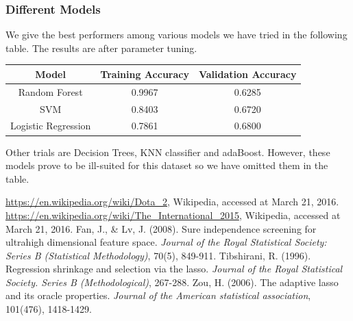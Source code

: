 \documentclass[11pt]{article}
\begin{document}
\subsubsection{Different Models}
We give the best performers among various models we have tried in the following table. The results are after parameter tuning.
\begin{center}
	\begin{tabular}{| c | c | c |}\hline
		Model & Training Accuracy & Validation Accuracy \\\hline
		Random Forest & 0.9967 & 0.6285 \\\hline
		SVM & 0.8403 & 0.6720 \\\hline
		Logistic Regression & 0.7861 & 0.6800 \\\hline
	\end{tabular}
\end{center}
Other trials are Decision Trees, KNN classifier and adaBoost. However, these models prove to be ill-suited for this dataset so we have omitted them in the table.

\begin{thebibliography}{9}
	 \url{https://en.wikipedia.org/wiki/Dota_2}, Wikipedia, accessed at March 21, 2016.
	 \url{https://en.wikipedia.org/wiki/The_International_2015}, Wikipedia, accessed at March 21, 2016.
	 Fan, J., \& Lv, J. (2008). Sure independence screening for ultrahigh dimensional feature space. \emph{Journal of the Royal Statistical Society: Series B (Statistical Methodology)}, 70(5), 849-911.
	 Tibshirani, R. (1996). Regression shrinkage and selection via the lasso. \emph{Journal of the Royal Statistical Society. Series B (Methodological)}, 267-288.
	 Zou, H. (2006). The adaptive lasso and its oracle properties. \emph{Journal of the American statistical association}, 101(476), 1418-1429.
\end{thebibliography}
\end{document}
